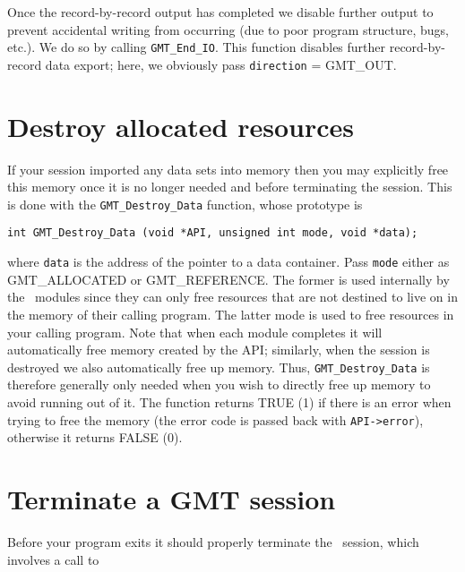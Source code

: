 \documentclass[11pt]{report}
\begin{document}
Once the record-by-record output has completed we disable further output to prevent accidental
writing from occurring (due to poor program structure, bugs, etc.).  We do so by calling \texttt{GMT\_End\_IO}.  This
function disables further record-by-record data export; here, we obviously pass \texttt{direction} = GMT\_OUT.

\section{Destroy allocated resources}

If your session imported any data sets into memory then you may explicitly free this
memory once it is no longer needed and before terminating the session.
This is done with the \texttt{GMT\_Destroy\_Data} function, whose prototype is

\begin{verbatim}
int GMT_Destroy_Data (void *API, unsigned int mode, void *data);
\end{verbatim}
where \texttt{data} is the address of the pointer to a data container.
Pass \texttt{mode} either as GMT\_ALLOCATED or GMT\_REFERENCE.  The former
is used internally by the \GMT\ modules since they can only free resources that are
not destined to live on in the memory of their calling program.  The latter mode is used
to free resources in your calling program.  Note that when each module completes it will
automatically free memory created by the API; similarly, when the session is destroyed
we also automatically free up memory.  Thus, \texttt{GMT\_Destroy\_Data} is therefore
generally only needed when you wish to directly free up memory to avoid running out of it.
The function returns TRUE (1) if there is an error when trying to free the memory
(the error code is passed back with \texttt{API->error}), otherwise it returns FALSE (0).

\section{Terminate a GMT session}

Before your program exits it should properly terminate the \GMT\ session, which involves a call to
\end{document}

